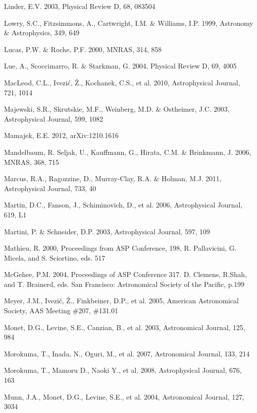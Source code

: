 \documentclass{emulateapj}
\begin{document}
\begin{thebibliography}{}
\bibitem[()]{} Linder, E.V. 2003, Physical Review D, 68, 083504
	
\bibitem[()]{} Lowry, S.C., Fitzsimmons, A., Cartwright, I.M. \& Williams, I.P. 1999, Astronomy \& 
             Astrophysics, 349, 649

\bibitem[()]{} Lucas, P.W. \& Roche, P.F. 2000, MNRAS, 314, 858
	
\bibitem[()]{} Lue, A., Scoccimarro, R. \& Starkman, G. 2004, Physical Review D, 69, 4005

\bibitem[()]{} MacLeod, C.L., Ivezi\'{c}, \v{Z}., Kochanek, C.S., et al. 2010, Astrophysical Journal, 721, 1014

\bibitem[()]{} Majewski, S.R., Skrutskie, M.F., Weinberg, M.D. \& Ostheimer, J.C. 2003, 
             Astrophysical Journal, 599, 1082

\bibitem[()]{} Mamajek, E.E. 2012, arXiv:1210.1616

\bibitem[()]{} Mandelbaum, R. Seljak, U., Kauffmann, G., Hirata, C.M. \& Brinkmann, J. 2006, MNRAS, 368, 715

\bibitem[()]{} Marcus, R.A., Ragozzine, D., Murray-Clay, R.A. \& Holman, M.J. 2011, Astrophysical Journal, 733, 40

\bibitem[()]{} Martin, D.C., Fanson, J., Schiminovich, D., et al. 2006, Astrophysical Journal, 619, L1

\bibitem[()]{} Martini, P. \& Schneider, D.P. 2003, Astrophysical Journal, 597, 109

\bibitem[()]{} Mathieu, R. 2000, Proceedings from ASP Conference, 198, R. Pallavicini, G. Micela, and 
             S. Sciortino, eds. 517

\bibitem[()]{} McGehee, P.M. 2004, Proceedings of ASP Conference 317. D. Clemens, R.Shah, and T. Brainerd, 
                    eds. San Francisco: Astronomical Society of the Pacific, p.199

\bibitem[()]{} Meyer, J.M., Ivezi\'{c}, \v{Z}., Finkbeiner, D.P., et al. 2005, American Astronomical 
             Society, AAS Meeting \#207, \#131.01

\bibitem[()]{} Monet, D.G., Levine, S.E., Canzian, B., et al. 2003, Astronomical Journal, 125, 984

\bibitem[()]{} Morokuma, T., Inada, N., Oguri, M., et al. 2007, Astronomical Journal, 133, 214

\bibitem[()]{} Morokuma, T., Mamoru D., Naoki Y., et al. 2008, Astrophysical Journal, 676, 163	

\bibitem[()]{} Munn, J.A., Monet, D.G., Levine, S.E., et al. 2004, Astronomical Journal, 127, 3034
	

\end{thebibliography}
\end{document}
